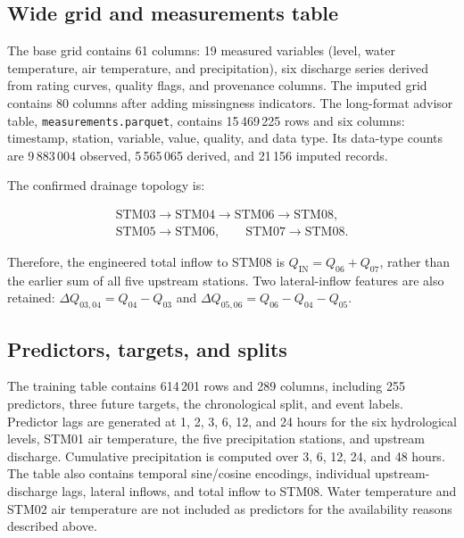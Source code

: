 \documentclass[twocolumn,twoside,a4paper,10pt]{IEEEtran}
\begin{document}
\subsection{Wide grid and measurements table}

The base grid contains 61 columns: 19 measured variables (level, water
temperature, air temperature, and precipitation), six discharge series
derived from rating curves, quality flags, and provenance columns. The
imputed grid contains 80 columns after adding missingness indicators. The
long-format advisor table, \texttt{measurements.parquet}, contains
15\,469\,225 rows and six columns: timestamp, station, variable, value,
quality, and data type. Its data-type counts are 9\,883\,004 observed,
5\,565\,065 derived, and 21\,156 imputed records.

The confirmed drainage topology is:

\begin{equation*}
\begin{gathered}
\mathrm{STM03}\longrightarrow\mathrm{STM04}\longrightarrow\mathrm{STM06}
\longrightarrow\mathrm{STM08},\\
\mathrm{STM05}\longrightarrow\mathrm{STM06},\qquad
\mathrm{STM07}\longrightarrow\mathrm{STM08}.
\end{gathered}
\end{equation*}

Therefore, the engineered total inflow to STM08 is
$Q_{\mathrm{IN}}=Q_{06}+Q_{07}$, rather than the earlier sum of all five
upstream stations. Two lateral-inflow features are also retained:
$\Delta Q_{03,04}=Q_{04}-Q_{03}$ and
$\Delta Q_{05,06}=Q_{06}-Q_{04}-Q_{05}$.

\subsection{Predictors, targets, and splits}

The training table contains 614\,201 rows and 289 columns, including 255
predictors, three future targets, the chronological split, and event labels.
Predictor lags are generated at 1, 2, 3, 6, 12, and 24 hours for the six
hydrological levels, STM01 air temperature, the five precipitation stations,
and upstream discharge. Cumulative precipitation is computed over 3, 6, 12,
24, and 48 hours. The table also contains temporal sine/cosine encodings,
individual upstream-discharge lags, lateral inflows, and total inflow to
STM08. Water temperature and STM02 air temperature are not included as
predictors for the availability reasons described above.
\end{document}
